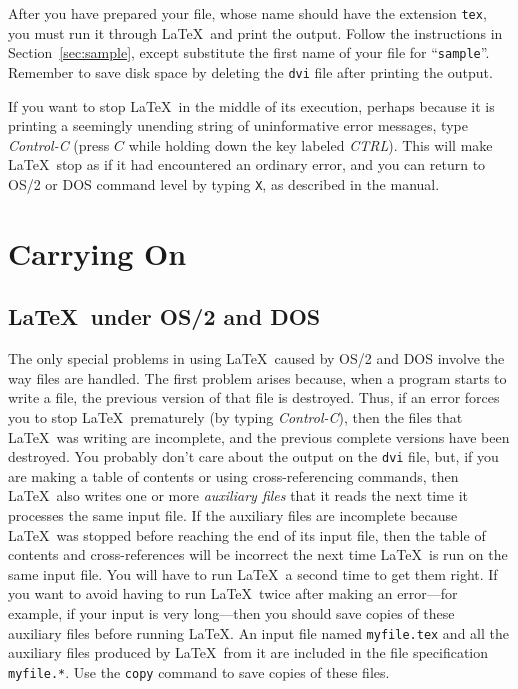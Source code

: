 After you have prepared your file, whose name should have the extension
{\tt tex}, you must run it through \LaTeX\ and print the output.
Follow the instructions in Section~\ref{sec:sample}, except substitute
the first name of your file for ``\mbox{\tt sample}''.  Remember to
save disk space by deleting the {\tt dvi} file after printing the
output.
 
 
 
If you want to stop \LaTeX\ in the middle of its execution, perhaps
because it is printing a seemingly unending string of uninformative
error messages, type {\em Control-C\/} (press $C$ while holding down
the key labeled {\em CTRL\/}).  This will make \LaTeX\ stop as if it
had encountered an ordinary error, and you can return to OS/2 or DOS command
level by typing {\tt X}, as described in the manual.
  
\section{Carrying On}
 
\subsection{\LaTeX\ under OS/2 and DOS} \label{sec:op-system}
 
The only special problems in using \LaTeX\ caused by OS/2 and DOS
involve the way files are handled.  The first
problem arises because, when a program starts to write a file, the
previous version of that file is destroyed.  Thus, if an error forces
you to stop \LaTeX\ prematurely (by typing {\em Control-C\/}),
then the files that \LaTeX\ was writing are incomplete,
and the previous complete versions have been destroyed.  You probably
don't care about the output on the {\tt dvi} file, but, if you are
making a table of contents or using cross-referencing commands, then
\LaTeX\ also writes one or more {\em auxiliary files\/} that it reads
the next time it processes the same input file.  If the auxiliary files
are incomplete because \LaTeX\ was stopped before reaching the end of
its input file, then the table of contents and cross-references will be
incorrect the next time \LaTeX\ is run on the same input file.  You
will have to run \LaTeX\ a second time to get them right.  If you want
to avoid having to run \LaTeX\ twice after making an error---for
example, if your input is very long---then you should save copies of
these auxiliary files before running \LaTeX. An input file named
\mbox{\tt myfile.tex} and all the auxiliary files produced by \LaTeX\
from it are included in the file specification \mbox{\tt myfile.*}.
Use the {\tt copy} command to save copies of these files.
 
